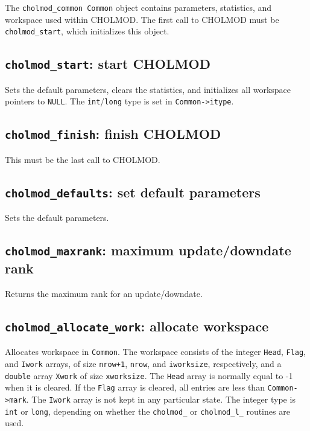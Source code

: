 \documentclass[11pt]{article}
\begin{document}

The {\tt cholmod\_common Common} object contains parameters, statistics, and
workspace used within CHOLMOD.  The first call to CHOLMOD must be
{\tt cholmod\_start}, which initializes this object.

\newpage \subsection{{\tt cholmod\_start}: start CHOLMOD}


Sets the default parameters, clears the statistics, and initializes all
workspace pointers to {\tt NULL}.  The {\tt int}/{\tt long} type
is set in {\tt Common->itype}.

\subsection{{\tt cholmod\_finish}: finish CHOLMOD}


This must be the last call to CHOLMOD.

\subsection{{\tt cholmod\_defaults}: set default parameters}


Sets the default parameters.

\subsection{{\tt cholmod\_maxrank}: maximum update/downdate rank}


Returns the maximum rank for an update/downdate.

\subsection{{\tt cholmod\_allocate\_work}: allocate workspace}


Allocates workspace in {\tt Common}.  The workspace consists
of the integer {\tt Head}, {\tt Flag}, and {\tt Iwork} arrays,
of size {\tt nrow+1}, {\tt nrow}, and {\tt iworksize},
respectively, and a {\tt double} array {\tt Xwork} of size
{\tt xworksize}.  The {\tt Head} array is normally equal to -1
when it is cleared.  If the {\tt Flag} array is cleared,
all entries are less than {\tt Common->mark}.  The {\tt Iwork} array is
not kept in any particular state.
The integer type is {\tt int} or {\tt long}, depending
on whether the {\tt cholmod\_} or {\tt cholmod\_l\_} routines
are used.
\end{document}
